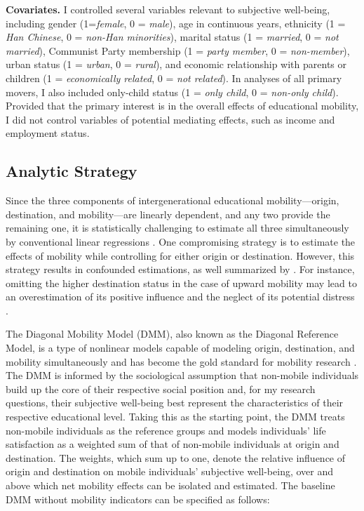 \textbf{Covariates.} I controlled several variables relevant to subjective well-being, including gender (1=\textit{female}, 0 = \textit{male}), age in continuous years, ethnicity (1 = \textit{Han Chinese}, 0 = \textit{non-Han minorities}), marital status (1 = \textit{married}, 0 = \textit{not married}), Communist Party membership (1 = \textit{party member}, 0 = \textit{non-member}), urban status (1 = \textit{urban}, 0 = \textit{rural}), and economic relationship with parents or children (1 = \textit{economically related}, 0 = \textit{not related}). In analyses of all primary movers, I also included only-child status (1 = \textit{only child}, 0 = \textit{non-only child}). Provided that the primary interest is in the overall effects of educational mobility, I did not control variables of potential mediating effects, such as income and employment status.

\subsection{Analytic Strategy}

Since the three components of intergenerational educational mobility—origin, destination, and mobility—are linearly dependent, and any two provide the remaining one, it is statistically challenging to estimate all three simultaneously by conventional linear regressions \parencite{sobelDiagonalMobilityModels1981}. One compromising strategy is to estimate the effects of mobility while controlling for either origin or destination. However, this strategy results in confounded estimations, as well summarized by \textcite{schuckDoesIntergenerationalEducational2018}. For instance, omitting the higher destination status in the case of upward mobility may lead to an overestimation of its positive influence and the neglect of its potential distress \parencite{nikolaevIntergenerationalMobilitySubjective2014}.

The Diagonal Mobility Model (DMM), also known as the Diagonal Reference Model, is a type of nonlinear models capable of modeling origin, destination, and mobility simultaneously and has become the gold standard for mobility research \parencite{sobelDiagonalMobilityModels1981,sobelSocialMobilityFertility1985,zangMobilityEffectsHypothesis2023}. The DMM is informed by the sociological assumption that non-mobile individuals build up the core of their respective social position and, for my research questions, their subjective well-being best represent the characteristics of their respective educational level. Taking this as the starting point, the DMM treats non-mobile individuals as the reference groups and models individuals' life satisfaction as a weighted sum of that of non-mobile individuals at origin and destination. The weights, which sum up to one, denote the relative influence of origin and destination on mobile individuals' subjective well-being, over and above which net mobility effects can be isolated and estimated. The baseline DMM without mobility indicators can be specified as follows:


